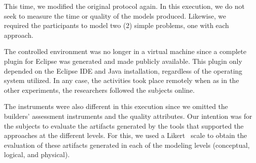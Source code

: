This time, we modified the original protocol again.
In this execution, we do not seek to measure the time or quality of the models produced.
Likewise, we required the participants to model two (2) simple problems, one with each approach.

The controlled environment was no longer in a virtual machine since a complete plugin for Eclipse was generated and made publicly available.
This plugin only depended on the Eclipse IDE and Java installation, regardless of the operating system utilized.
In any case, the activities took place remotely when as in the other experiments, the researchers followed the subjects online.

The instruments were also different in this execution since we omitted the builders' assessment instruments and the quality attributes.
Our intention was for the subjects to evaluate the artifacts generated by the tools that supported the approaches at the different levels.
For this, we used a Likert~\cite{Likert} scale to obtain the evaluation of these artifacts generated in each of the modeling levels (conceptual, logical, and physical).

